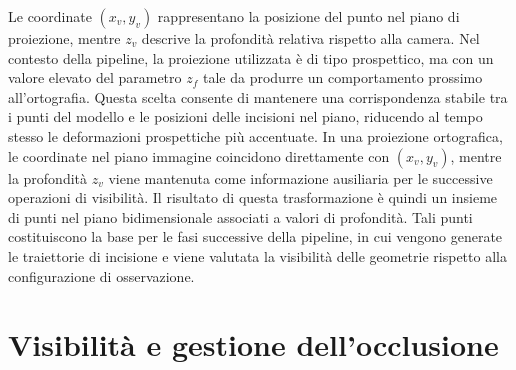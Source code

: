 \documentclass[a4paper,11pt,titlepage,twoside]{book}
\newcommand{\1}{\mathbf{1}}
\numberwithin{equation}{chapter}
\theoremstyle{plain}
\theoremstyle{definition}
\begin{document}
	Le coordinate \((x_v, y_v)\) rappresentano la posizione del punto nel piano di proiezione, mentre \(z_v\) descrive la profondità relativa rispetto alla camera. Nel contesto della pipeline, la proiezione utilizzata è di tipo prospettico, ma con un valore elevato del parametro \(z_f\) tale da produrre un comportamento prossimo all’ortografia. Questa scelta consente di mantenere una corrispondenza stabile tra i punti del modello e le posizioni delle incisioni nel piano, riducendo al tempo stesso le deformazioni prospettiche più accentuate. In una proiezione ortografica, le coordinate nel piano immagine coincidono direttamente con \((x_v, y_v)\), mentre la profondità \(z_v\) viene mantenuta come informazione ausiliaria per le successive operazioni di visibilità.
	Il risultato di questa trasformazione è quindi un insieme di punti nel piano bidimensionale associati a valori di profondità. Tali punti costituiscono la base per le fasi successive della pipeline, in cui vengono generate le traiettorie di incisione e viene valutata la visibilità delle geometrie rispetto alla configurazione di osservazione.

	\section{Visibilità e gestione dell’occlusione}
	
\end{document}

